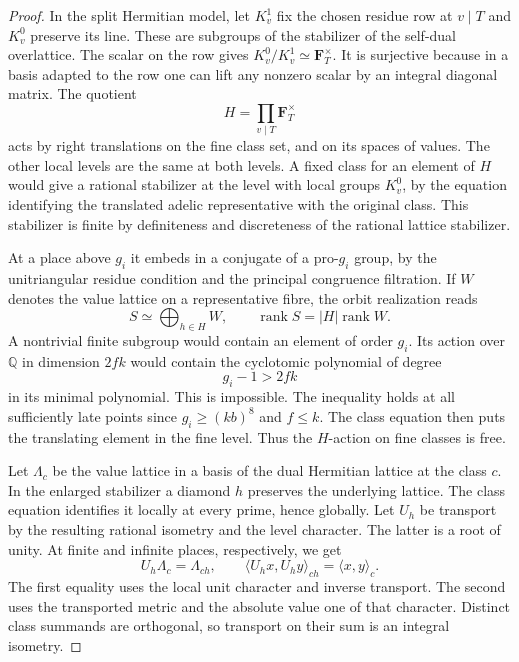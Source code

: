 \begin{proof}
In the split Hermitian model,
let \(K_v^1\) fix the chosen residue row at \(v\mid T\) and
\(K_v^0\) preserve its line. These are subgroups of the
stabilizer of the self-dual overlattice. The scalar on the
row gives \(K_v^0/K_v^1\simeq\mathbf F_T^\times\). It is
surjective because in a basis adapted to the row one can
lift any nonzero scalar by an integral diagonal matrix.
The quotient
\[
                   H=\prod_{v\mid T}\mathbf F_T^\times
\]
acts by right translations on the fine class set, and on
its spaces of values. The other local levels are the same
at both levels. A fixed class for an element of \(H\)
would give a rational stabilizer at the level with local
groups \(K_v^0\), by the equation identifying the translated
adelic representative with the original class. This stabilizer is finite by definiteness and discreteness of
the rational lattice stabilizer.

At a place above \(g_i\) it embeds
in a conjugate of a pro-\(g_i\) group, by the unitriangular residue
condition and the principal congruence filtration.
If \(W\) denotes the value lattice on a representative fibre, the orbit realization reads
\[
  S\simeq\bigoplus_{h\in H}W,\qquad \operatorname{rank} S=|H|\operatorname{rank}W .
\]
 A nontrivial
finite subgroup would contain an element of order \(g_i\). Its
action over \(\mathbb Q\) in dimension \(2fk\) would contain the
cyclotomic polynomial of degree 
\[
  g_i-1>2fk
\]
 in its minimal
polynomial. This is impossible. The inequality holds at all
sufficiently late points since \(g_i\ge(kb)^8\) and \(f\le k\). The class equation then puts the translating
element in the fine level. Thus the \(H\)-action on fine
classes is free.

Let \(\Lambda_c\) be the value lattice in a basis of the dual
Hermitian lattice at the class \(c\). In the enlarged stabilizer
a diamond \(h\) preserves the underlying lattice. The class
equation identifies it locally at every prime, hence globally.
Let \(U_h\) be transport by the resulting rational isometry
and the level character. The latter is a root of unity. At
finite and infinite places, respectively, we get
\[
 U_h\Lambda_c=\Lambda_{ch},\qquad
 \langle U_h x,U_h y\rangle_{ch}=\langle x,y\rangle_c .
\]
The first equality uses the local unit character and inverse
transport. The second uses the transported metric and the
absolute value one of that character. Distinct class summands
are orthogonal, so transport on their sum is an integral isometry.


\end{proof}
